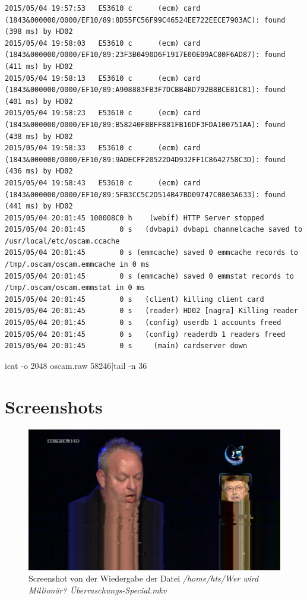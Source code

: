 \begin{cmd}[H]
\begin{Verbatim}[fontsize=\tiny]
2015/05/04 19:57:53   E53610 c      (ecm) card (1843&000000/0000/EF10/89:8D55FC56F99C46524EE722EECE7903AC): found (398 ms) by HD02
2015/05/04 19:58:03   E53610 c      (ecm) card (1843&000000/0000/EF10/89:23F3B0490D6F1917E00E09AC80F6AD87): found (411 ms) by HD02
2015/05/04 19:58:13   E53610 c      (ecm) card (1843&000000/0000/EF10/89:A908883FB3F7DCBB4BD792B8BCE81C81): found (401 ms) by HD02
2015/05/04 19:58:23   E53610 c      (ecm) card (1843&000000/0000/EF10/89:B58240F8BFF881FB16DF3FDA100751AA): found (438 ms) by HD02
2015/05/04 19:58:33   E53610 c      (ecm) card (1843&000000/0000/EF10/89:9ADECFF20522D4D932FF1C8642758C3D): found (436 ms) by HD02
2015/05/04 19:58:43   E53610 c      (ecm) card (1843&000000/0000/EF10/89:5FB3CC5C2D514B47BD09747C0803A633): found (441 ms) by HD02
2015/05/04 20:01:45 100008C0 h    (webif) HTTP Server stopped
2015/05/04 20:01:45        0 s   (dvbapi) dvbapi channelcache saved to /usr/local/etc/oscam.ccache
2015/05/04 20:01:45        0 s (emmcache) saved 0 emmcache records to /tmp/.oscam/oscam.emmcache in 0 ms
2015/05/04 20:01:45        0 s (emmcache) saved 0 emmstat records to /tmp/.oscam/oscam.emmstat in 0 ms
2015/05/04 20:01:45        0 s   (client) killing client card
2015/05/04 20:01:45        0 s   (reader) HD02 [nagra] Killing reader
2015/05/04 20:01:45        0 s   (config) userdb 1 accounts freed
2015/05/04 20:01:45        0 s   (config) readerdb 1 readers freed
2015/05/04 20:01:45        0 s     (main) cardserver down
\end{Verbatim}
\caption{icat -o 2048 oscam.raw 58246|tail -n 36}
\label{cmd:oscam-logtail}
\end{cmd}

\section{Screenshots}

\begin{figure}[H]
\includegraphics[scale=0.5]{rtlhd-millionaer.png} 
\caption{Screenshot von der Wiedergabe der Datei \textit{/home/hts/Wer wird Millionär? Überraschungs-Special.mkv}}
\label{fig:tvheadend-rtlhd}
\end{figure}
